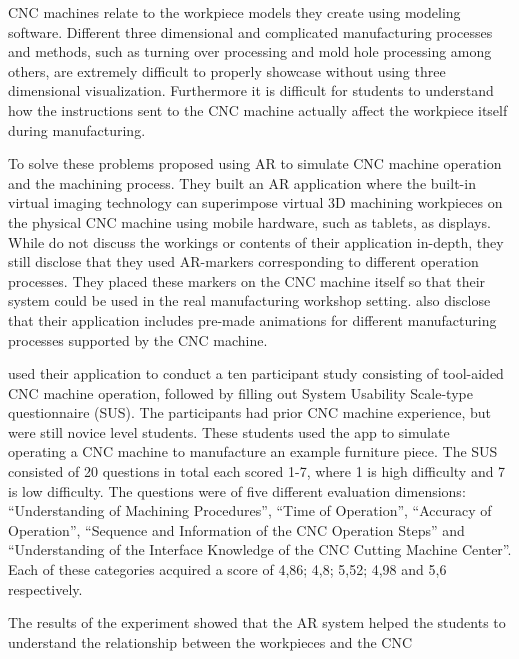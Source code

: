 CNC machines relate to the workpiece models they create using modeling 
software.\cite{LinAndLee2020} Different three dimensional and complicated 
manufacturing processes and methods, such as turning over processing and mold 
hole processing among others, are extremely difficult to properly showcase 
without using three dimensional visualization.\cite{LinAndLee2020} 
Furthermore it is difficult for students to understand how the instructions 
sent to the CNC machine actually affect the workpiece itself during 
manufacturing.\cite{LinAndLee2020}\par
	To solve these problems \textcite{LinAndLee2020} proposed using AR to 
simulate CNC machine operation and the machining process.\cite{LinAndLee2020} 
They built an AR application where the built-in virtual imaging technology 
can superimpose virtual 3D machining workpieces on the physical CNC machine 
using mobile hardware, such as tablets, as displays.\cite{LinAndLee2020} 
While \textcite{LinAndLee2020} do not discuss the workings or contents of 
their application in-depth, they still disclose that they used AR-markers 
corresponding to different operation processes. They placed these markers on 
the CNC machine itself so that their system could be used in the real 
manufacturing workshop setting.\cite{LinAndLee2020} \textcite{LinAndLee2020} 
also disclose that their application includes pre-made animations for 
different manufacturing processes supported by the CNC machine.\par
	\textcite{LinAndLee2020} used their application to conduct a ten 
participant study consisting of tool-aided CNC machine operation, followed by 
filling out System Usability Scale-type questionnaire (SUS). The participants 
had prior CNC machine experience, but were still novice level 
students.\cite{LinAndLee2020} These students used the app to simulate 
operating a CNC machine to manufacture an example furniture piece. The SUS 
consisted of 20 questions in total each scored 1-7, where 1 is high 
difficulty and 7 is low difficulty. The questions were of five different 
evaluation dimensions: “Understanding of Machining Procedures”, “Time of 
Operation”, “Accuracy of Operation”, “Sequence and Information of the CNC 
Operation Steps” and “Understanding of the Interface Knowledge of the CNC 
Cutting Machine Center”.\cite{LinAndLee2020} Each of these categories acquired 
a score of 4,86; 4,8; 5,52; 4,98 and 5,6 respectively.\cite{LinAndLee2020}\par
	The results of the experiment showed that the AR system helped the 
students to understand the relationship between the workpieces and the CNC 
